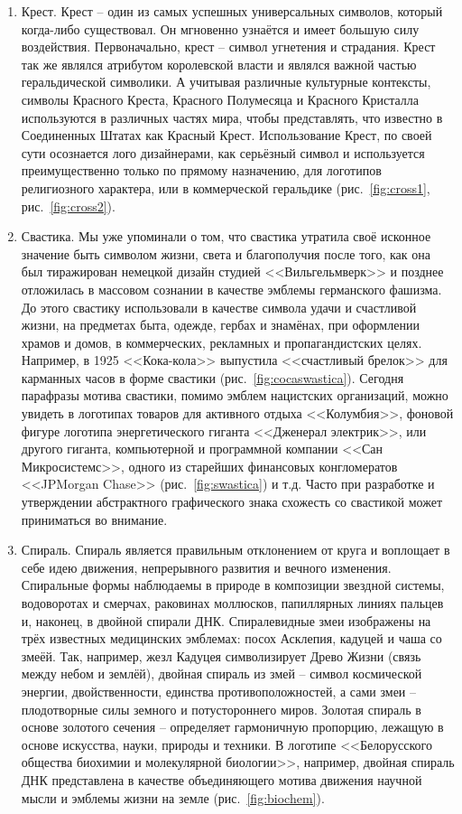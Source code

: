 \begin{enumerate}
\item Крест. Крест -- один из самых успешных универсальных символов, который
  когда-либо существовал. Он мгновенно узнаётся и  имеет большую силу
  воздействия. Первоначально, крест -- символ угнетения и страдания. Крест так
  же являлся атрибутом королевской власти и являлся важной частью
  геральдической символики. А учитывая различные культурные контексты,
  символы Красного Креста, Красного Полумесяца и Красного Кристалла
  используются в различных частях мира, чтобы представлять, что известно в
  Соединенных Штатах как Красный Крест. Использование Крест, по своей сути
  осознается лого дизайнерами, как серьёзный символ и используется
  преимущественно только по прямому назначению, для логотипов религиозного
  характера, или в коммерческой геральдике (рис.~\ref{fig:cross1}, рис.~\ref{fig:cross2}).

\item Свастика. Мы уже упоминали о том, что свастика утратила своё исконное
  значение быть символом жизни, света и благополучия после того, как она был
  тиражирован немецкой дизайн студией <<Вильгельмверк>> и позднее отложилась в
  массовом сознании в качестве эмблемы германского фашизма. До этого свастику
  использовали в качестве символа удачи и счастливой жизни, на предметах быта,
  одежде, гербах и знамёнах, при оформлении храмов и домов, в коммерческих,
  рекламных и пропагандистских целях. Например, в 1925 <<Кока-кола>> выпустила
  <<счастливый брелок>> для карманных часов в форме свастики (рис.~\ref{fig:cocaswastica}).
  Сегодня парафразы мотива свастики, помимо эмблем нацистских организаций,
  можно увидеть в логотипах товаров для активного отдыха <<Колумбия>>,
  фоновой фигуре логотипа энергетического гиганта <<Дженерал электрик>>,
  или другого гиганта, компьютерной и программной компании <<Сан Микросистемс>>,
  одного из старейших финансовых конгломератов <<JPMorgan Chase>> (рис.~\ref{fig:swastica})
  и т.д. Часто при разработке и утверждении абстрактного графического знака
  схожесть со свастикой может приниматься во внимание.

\item Спираль. Спираль является правильным отклонением от круга и воплощает
  в себе идею движения, непрерывного развития и вечного изменения. Спиральные
  формы наблюдаемы в природе в композиции звездной системы, водоворотах и
  смерчах, раковинах моллюсков, папиллярных линиях пальцев и, наконец, в
  двойной спирали ДНК. Спиралевидные змеи изображены на трёх известных
  медицинских эмблемах: посох Асклепия, кадуцей и чаша со змеёй. Так,
  например, жезл Кадуцея символизирует Древо Жизни (связь между небом и землёй),
  двойная спираль из змей -- символ космической энергии, двойственности,
  единства противоположностей, а сами змеи -- плодотворные силы земного и
  потустороннего миров. Золотая спираль в основе золотого сечения -- определяет
  гармоничную пропорцию, лежащую в основе искусства, науки, природы и
  техники. В логотипе <<Белорусского общества биохимии и молекулярной биологии>>,
  например, двойная спираль ДНК представлена в качестве объединяющего мотива
  движения научной мысли и эмблемы жизни на земле (рис.~\ref{fig:biochem}).
\end{enumerate}

